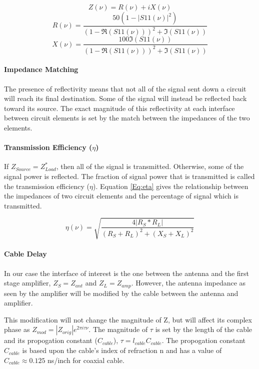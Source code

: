 \begin{equation}\label{Eq:Imp_calc}
Z(\nu) = R(\nu)+ i X(\nu) 
\end{equation}
\begin{equation}
R(\nu) = \frac{50 (1-|S11(\nu)|^2)}{(1-\Re(S11(\nu)))^2 + \Im(S11(\nu))} 
\end{equation}
\begin{equation}
X(\nu) = \frac{100 \Im(S11(\nu))}{(1-\Re(S11(\nu)))^2 + \Im(S11(\nu))} 
\end{equation}

\paragraph{Impedance Matching}

The presence of reflectivity means that not all of the signal sent down a circuit will reach its final destination. Some of the signal will instead be reflected back toward its source. The exact magnitude of this reflectivity at each interface between circuit elements is set by the match between the impedances of the two elements. 

\paragraph{Transmission Efficiency ($\eta$)}

If $Z_{Source} = Z^*_{Load}$, then all of the signal is transmitted. Otherwise, some of the signal power is reflected. The fraction of signal power that is transmitted is called the transmission efficiency ($\eta$). Equation \ref{Eq:eta} gives the relationship between the impedances of two circuit elements and the percentage of signal which is transmitted. 

\begin{equation} \label{Eq:eta}
\eta (\nu) = \sqrt{\frac{4 |R_{S}*R_{L}|}{(R_{S}+R_{L})^2+(X_{S}+X_{L})^2}}
\end{equation}

\paragraph{Cable Delay}

In our case the interface of interest is the one between the antenna and the first stage amplifier, $Z_S = Z_{ant}$ and $Z_L = Z_{amp}$. However, the antenna impedance as seen by the amplifier will be modified by the cable between the antenna and amplifier. 

This modification will not change the magnitude of Z, but will affect its complex phase as $Z_{mod} = |Z_{orig}| e^{2 \pi i \tau \nu }$. The magnitude of $\tau$ is set by the length of the cable and its propogation constant ($C_{cable}$), $\tau = l_{cable} C_{cable}$. The propogation constant $C_{cable}$ is based upon the cable's index of refraction n and has a value of $C_{cable} \approx 0.125$ ns/inch for coaxial cable. 

